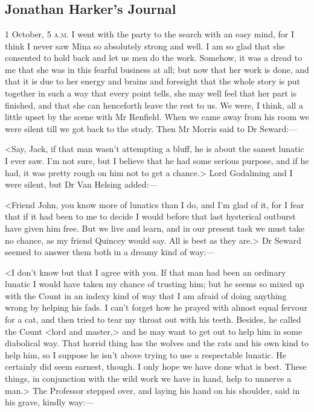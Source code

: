 \chapter[Chapter \thechapter]{}

\section{Jonathan Harker's Journal}
	
\begin{diary}{1 October, 5 \textsc{a.m.}}
I went with the party to the search with an easy mind, for I think I never saw Mina so absolutely strong and well. I am so glad that she consented to hold back and let us men do the work. Somehow, it was a dread to me that she was in this fearful business at all; but now that her work is done, and that it is due to her energy and brains and foresight that the whole story is put together in such a way that every point tells, she may well feel that her part is finished, and that she can henceforth leave the rest to us. We were, I think, all a little upset by the scene with Mr Renfield. When we came away from his room we were silent till we got back to the study. Then Mr Morris said to Dr Seward:—

<Say, Jack, if that man wasn't attempting a bluff, he is about the sanest lunatic I ever saw. I'm not sure, but I believe that he had some serious purpose, and if he had, it was pretty rough on him not to get a chance.> Lord Godalming and I were silent, but Dr Van Helsing added:—

<Friend John, you know more of lunatics than I do, and I'm glad of it, for I fear that if it had been to me to decide I would before that last hysterical outburst have given him free. But we live and learn, and in our present task we must take no chance, as my friend Quincey would say. All is best as they are.> Dr Seward seemed to answer them both in a dreamy kind of way:—

<I don't know but that I agree with you. If that man had been an ordinary lunatic I would have taken my chance of trusting him; but he seems so mixed up with the Count in an indexy kind of way that I am afraid of doing anything wrong by helping his fads. I can't forget how he prayed with almost equal fervour for a cat, and then tried to tear my throat out with his teeth. Besides, he called the Count <lord and master,> and he may want to get out to help him in some diabolical way. That horrid thing has the wolves and the rats and his own kind to help him, so I suppose he isn't above trying to use a respectable lunatic. He certainly did seem earnest, though. I only hope we have done what is best. These things, in conjunction with the wild work we have in hand, help to unnerve a man.> The Professor stepped over, and laying his hand on his shoulder, said in his grave, kindly way:—


\end{diary}
